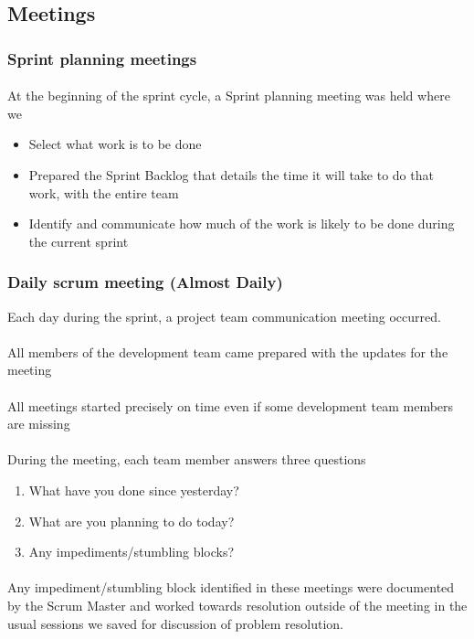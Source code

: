 \documentclass{article}
\begin{document}
\subsection{Meetings}
\subsubsection{Sprint planning meetings}
\paragraph{}
At the beginning of the sprint cycle, a Sprint planning meeting was held where we
\begin{itemize}
\item Select what work is to be done
\item Prepared the Sprint Backlog that details the time it will take to do that work, with the entire team
\item Identify and communicate how much of the work is likely to be done during the current sprint
\end{itemize}

\subsubsection{Daily scrum meeting (Almost Daily)}
Each day during the sprint, a project team communication meeting occurred.
\paragraph{}All members of the development team came prepared with the updates for the meeting
\paragraph{}All meetings started precisely on time even if some development team members are missing

\paragraph{}During the meeting, each team member answers three questions
\begin{enumerate}
\item What have you done since yesterday?
\item What are you planning to do today?
\item Any impediments/stumbling blocks?
\end{enumerate}
\paragraph{}Any impediment/stumbling block identified in these meetings were documented by the Scrum Master and worked towards resolution outside of the meeting in the usual sessions we saved for discussion of problem resolution.
\end{document}
